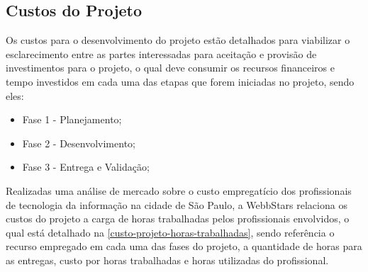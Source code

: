 \subsection{Custos do Projeto}

Os custos para o desenvolvimento do projeto estão detalhados para viabilizar o esclarecimento entre as partes interessadas para aceitação e provisão de investimentos para o projeto, o qual deve consumir os recursos financeiros e tempo investidos em cada uma das etapas que forem iniciadas no projeto, sendo eles: 

\begin{itemize}
    \item Fase 1 - Planejamento;
    \item Fase 2 - Desenvolvimento;
    \item Fase 3 - Entrega e Validação;
\end{itemize}

Realizadas uma análise de mercado sobre o custo empregatício dos profissionais de tecnologia da informação na cidade de São Paulo, a WebbStars relaciona os custos do projeto a carga de horas trabalhadas pelos profissionais envolvidos, o qual está detalhado na \autoref{custo-projeto-horas-trabalhadas}, sendo referência o recurso empregado em cada uma das fases do projeto, a quantidade de horas para as entregas, custo por horas trabalhadas e horas utilizadas do profissional.

